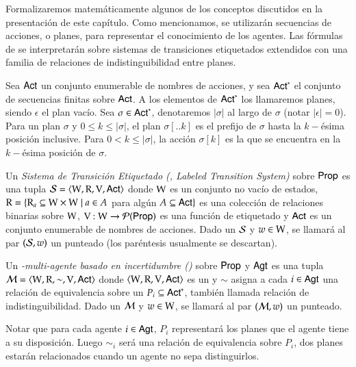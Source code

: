 Formalizaremos matemáticamente algunos de los conceptos discutidos en la presentación de este capítulo. Como mencionamos, se 
utilizarán secuencias de acciones, o planes, para representar el conocimiento de los agentes. Las fórmulas de \KHilogic se interpretarán 
sobre sistemas de transiciones etiquetados extendidos con una familia de relaciones de indistinguibilidad entre planes.

\begin{definicion}
    Sea ${\rm \sf Act}$ un conjunto enumerable de nombres de acciones, y sea ${\rm \sf Act}^*$ el conjunto de secuencias finitas sobre ${\rm \sf Act}$. 
    A los elementos de ${\rm \sf Act}^*$ los llamaremos planes, siendo $\epsilon$ el plan vacío. Sea $\sigma \in {\rm \sf Act}^*$, denotaremos $|\sigma|$ 
    al largo de $\sigma$ (notar $|\epsilon| = 0$). Para un plan $\sigma$ y $0 \leq k \leq |\sigma|$, el plan $\sigma[..k]$ es el prefijo 
    de $\sigma$ hasta la $k-$ésima posición inclusive. Para $0 < k \leq |\sigma|$, la acción $\sigma[k]$ es la que se encuentra en la 
    $k-$ésima posición de $\sigma$.  
\end{definicion}

\begin{definicion}
    Un \emph{Sistema de Transición Etiquetado (\lts, Labeled Transition System)} sobre ${\rm \sf Prop}$ es una tupla $\mathcal{S} = \langle \mathrm{W}, \mathrm{R}, \mathrm{V}, {\rm \sf Act} \rangle$ 
    donde $\mathrm{W}$ es un conjunto no vacío de estados, $\mathrm{R} = \{\mathrm{R}_a \subseteq \mathrm{W} \times \mathrm{W} \mid a \in A$ para algún $A \subseteq {\rm \sf Act}\}$ es 
    una colección de relaciones binarias sobre $\mathrm{W}$, $\mathrm{V} : \mathrm{W} \to \mathcal{P}({\rm \sf Prop})$ es una función de etiquetado y ${\rm \sf Act}$ es un 
    conjunto enumerable de nombres de acciones. Dado un \lts $\mathcal{S}$ y $w \in \mathrm{W}$, se llamará al par $(\mathcal{S},w)$ un \lts punteado 
    (los paréntesis usualmente se descartan).
\end{definicion}

\begin{definicion}
    Un \emph{\lts-multi-agente basado en incertidumbre (\ults)} sobre ${\rm \sf Prop}$ y ${\rm \sf Agt}$ es una tupla $\mathcal{M} = \langle \mathrm{W},\mathrm{R},\sim,\mathrm{V},{\rm \sf Act} \rangle$ 
    donde $\langle \mathrm{W},\mathrm{R},\mathrm{V},{\rm \sf Act} \rangle$ es un \lts y $\sim$ asigna a cada $i \in {\rm \sf Agt}$ una relación de equivalencia sobre un 
    $P_i \subseteq {\rm \sf Act}^*$, también llamada relación de indistinguibilidad. Dado un \ults $\mathcal{M}$ y $w \in \mathrm{W}$, se llamará 
    al par $(\mathcal{M},w)$ un \ults punteado.
\end{definicion}

Notar que para cada agente $i \in {\rm \sf Agt}$, $P_i$ representará los planes que el agente tiene a su disposición. 
Luego $\sim_i$ será una relación de equivalencia sobre $P_i$, dos planes estarán relacionados cuando un agente no sepa distinguirlos.

